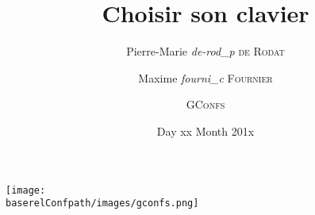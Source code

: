 \documentclass{beamer}
\begin{document}
\title{\workshoptitle}
\title{Choisir son clavier}
\author{Pierre-Marie \textit{de-rod\_p} \textsc{de Rodat} 
  \and Maxime \textit{fourni\_c} \textsc{Fournier} 
  \and \textsc{GConfs}
}
\date{Day xx Month 201x}


\begin{frame}
  \begin{center}
    \texttt{[image: \\baserelConfpath/images/gconfs.png]}
  \end{center}

  \maketitle
\end{frame}



\begin{frame}
  \tableofcontents
\end{frame}





\end{document}
